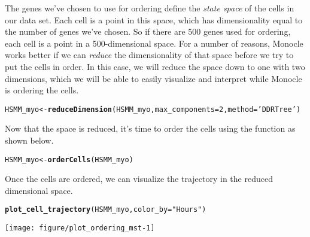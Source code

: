 \documentclass[10pt,oneside]{article}\usepackage[]{graphicx}\usepackage[]{color}
\makeatletter
\def\maxwidth{ %
  \ifdim\Gin@nat@width>\linewidth
    \linewidth
  \else
    \Gin@nat@width
  \fi
}
\newcommand{\hlnum}[1]{\textcolor[rgb]{0.686,0.059,0.569}{#1}}%
\newcommand{\hlstr}[1]{\textcolor[rgb]{0.192,0.494,0.8}{#1}}%
\newcommand{\hlstd}[1]{\textcolor[rgb]{0.345,0.345,0.345}{#1}}%
\newcommand{\hlkwb}[1]{\textcolor[rgb]{0.69,0.353,0.396}{#1}}%
\newcommand{\hlkwc}[1]{\textcolor[rgb]{0.333,0.667,0.333}{#1}}%
\newcommand{\hlkwd}[1]{\textcolor[rgb]{0.737,0.353,0.396}{\textbf{#1}}}%
\newenvironment{kframe}{%
 \def\at@end@of@kframe{}%
 \ifinner\ifhmode%
  \def\at@end@of@kframe{\end{minipage}}%
  \begin{minipage}{\columnwidth}%
 \fi\fi%
 \def\FrameCommand##1{\hskip\@totalleftmargin \hskip-\fboxsep
 \colorbox{shadecolor}{##1}\hskip-\fboxsep
     \hskip-\linewidth \hskip-\@totalleftmargin \hskip\columnwidth}%
 \MakeFramed {\advance\hsize-\width
   \@totalleftmargin\z@ \linewidth\hsize
   \@setminipage}}%
 {\par\unskip\endMakeFramed%
 \at@end@of@kframe}
\newenvironment{knitrout}{}{} %
\makeatother
\begin{document}
The genes we've chosen to use for ordering define the \emph{state space} of the cells in our data set.  Each cell is a point in this space, which has dimensionality equal to the number of genes we've chosen.  So if there are 500 genes used for ordering, each cell is a point in a 500-dimensional space.  For a number of reasons, Monocle works better if we can \emph{reduce} the dimensionality of that space before we try to put the cells in order.  In this case, we will reduce the space down to one with two dimensions, which we will be able to easily visualize and interpret while Monocle is ordering the cells.
\begin{knitrout}
\color{fgcolor}\begin{kframe}
\begin{alltt}
\hlstd{HSMM_myo} \hlkwb{<-} \hlkwd{reduceDimension}\hlstd{(HSMM_myo,} \hlkwc{max_components}\hlstd{=}\hlnum{2}\hlstd{,} \hlkwc{method} \hlstd{=} \hlstr{'DDRTree'}\hlstd{)}
\end{alltt}
\end{kframe}
\end{knitrout}
 
Now that the space is reduced, it's time to order the cells using the  function as shown below. 

\begin{knitrout}
\color{fgcolor}\begin{kframe}
\begin{alltt}
\hlstd{HSMM_myo} \hlkwb{<-} \hlkwd{orderCells}\hlstd{(HSMM_myo)}
\end{alltt}
\end{kframe}
\end{knitrout}

Once the cells are ordered, we can visualize the trajectory in the reduced 
dimensional space.
 
\begin{knitrout}
\color{fgcolor}\begin{kframe}
\begin{alltt}
\hlkwd{plot_cell_trajectory}\hlstd{(HSMM_myo,} \hlkwc{color_by}\hlstd{=}\hlstr{"Hours"}\hlstd{)}
\end{alltt}
\end{kframe}

{\centering \texttt{[image: figure/plot\_ordering\_mst-1]} 

}



\end{knitrout}
 
\end{document}
